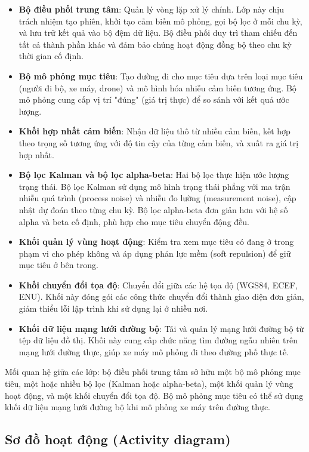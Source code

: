 \begin{itemize}
\item \textbf{Bộ điều phối trung tâm}: Quản lý vòng lặp xử lý chính. Lớp này chịu trách nhiệm tạo phiên, khởi tạo cảm biến mô phỏng, gọi bộ lọc ở mỗi chu kỳ, và lưu trữ kết quả vào bộ đệm dữ liệu. Bộ điều phối duy trì tham chiếu đến tất cả thành phần khác và đảm bảo chúng hoạt động đồng bộ theo chu kỳ thời gian cố định.
    \item \textbf{Bộ mô phỏng mục tiêu}: Tạo đường đi cho mục tiêu dựa trên loại mục tiêu (người đi bộ, xe máy, drone) và mô hình hóa nhiễu cảm biến tương ứng. Bộ mô phỏng cung cấp vị trí "đúng" (giá trị thực) để so sánh với kết quả ước lượng.
    \item \textbf{Khối hợp nhất cảm biến}: Nhận dữ liệu thô từ nhiều cảm biến, kết hợp theo trọng số tương ứng với độ tin cậy của từng cảm biến, và xuất ra giá trị hợp nhất.
    \item \textbf{Bộ lọc Kalman và bộ lọc alpha-beta}: Hai bộ lọc thực hiện ước lượng trạng thái. Bộ lọc Kalman sử dụng mô hình trạng thái phẳng với ma trận nhiễu quá trình (process noise) và nhiễu đo lường (measurement noise), cập nhật dự đoán theo từng chu kỳ. Bộ lọc alpha-beta đơn giản hơn với hệ số alpha và beta cố định, phù hợp cho mục tiêu chuyển động đều.
    \item \textbf{Khối quản lý vùng hoạt động}: Kiểm tra xem mục tiêu có đang ở trong phạm vi cho phép không và áp dụng phản lực mềm (soft repulsion) để giữ mục tiêu ở bên trong.
    \item \textbf{Khối chuyển đổi tọa độ}: Chuyển đổi giữa các hệ tọa độ (WGS84, ECEF, ENU). Khối này đóng gói các công thức chuyển đổi thành giao diện đơn giản, giảm thiểu lỗi lập trình khi sử dụng lại ở nhiều nơi.
    \item \textbf{Khối dữ liệu mạng lưới đường bộ}: Tải và quản lý mạng lưới đường bộ từ tệp dữ liệu đồ thị. Khối này cung cấp chức năng tìm đường ngẫu nhiên trên mạng lưới đường thực, giúp xe máy mô phỏng đi theo đường phố thực tế.
\end{itemize}

Mối quan hệ giữa các lớp: bộ điều phối trung tâm sở hữu một bộ mô phỏng mục tiêu, một hoặc nhiều bộ lọc (Kalman hoặc alpha-beta), một khối quản lý vùng hoạt động, và một khối chuyển đổi tọa độ. Bộ mô phỏng mục tiêu có thể sử dụng khối dữ liệu mạng lưới đường bộ khi mô phỏng xe máy trên đường thực.

\subsection{Sơ đồ hoạt động (Activity diagram)}


